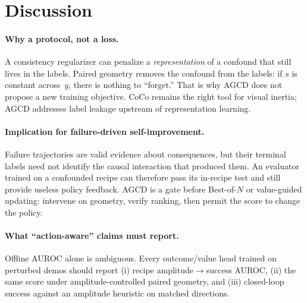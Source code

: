 \documentclass[conference]{IEEEtran}
\begin{document}
\section{Discussion}
\label{sec:disc}

\paragraph{Why a protocol, not a loss.}
A consistency regularizer can penalize a \emph{representation} of a confound
that still lives in the labels. Paired geometry removes the confound from the
labels: if $s$ is constant across~$y$, there is nothing to ``forget.'' That is
why AGCD does not propose a new training objective. CoCo remains the right tool
for visual inertia; AGCD addresses label leakage upstream of representation
learning.

\paragraph{Implication for failure-driven self-improvement.}
Failure trajectories are valid evidence about consequences, but their terminal
labels need not identify the causal interaction that produced them. An
evaluator trained on a confounded recipe can therefore pass its in-recipe test
and still provide useless policy feedback. AGCD is a gate before Best-of-$N$ or
value-guided updating: intervene on geometry, verify ranking, then permit the
score to change the policy.

\paragraph{What ``action-aware'' claims must report.}
Offline AUROC alone is ambiguous. Every outcome/value head trained on perturbed
demos should report (i) recipe amplitude$\rightarrow$success AUROC, (ii) the
same score under amplitude-controlled paired geometry, and (iii) closed-loop
success against an amplitude heuristic on matched directions.
\end{document}
